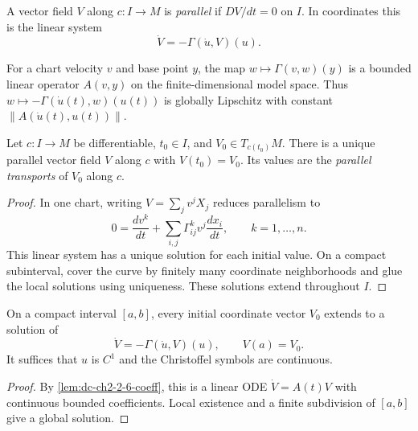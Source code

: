 \begin{definition}
  \label{def:dc-ch2-2-5}


  A vector field $V$ along $c\colon I\to M$ is \emph{parallel} if
  $DV/dt=0$ on $I$. In coordinates this is the linear system
  \[
    \dot V=-\Gamma(\dot u,V)(u).
  \]
\end{definition}

\begin{lemma}
  \label{lem:dc-ch2-2-6-coeff}


  For a chart velocity $v$ and base point $y$, the map
  $w\mapsto\Gamma(v,w)(y)$ is a bounded linear operator $A(v,y)$ on the
  finite-dimensional model space. Thus
  $w\mapsto-\Gamma(\dot u(t),w)(u(t))$ is globally Lipschitz with constant
  $\lVert A(\dot u(t),u(t))\rVert$.
\end{lemma}

\begin{proposition}
  \label{prop:dc-ch2-2-6}


  Let $c\colon I\to M$ be differentiable, $t_0\in I$, and
  $V_0\in T_{c(t_0)}M$. There is a unique parallel vector field $V$ along $c$
  with $V(t_0)=V_0$. Its values are the \emph{parallel transports} of $V_0$
  along $c$.
\end{proposition}
\begin{proof}
  \sketch
  In one chart, writing $V=\sum_jv^jX_j$ reduces parallelism to
  \[
    0=\frac{dv^k}{dt}
      +\sum_{i,j}\Gamma_{ij}^kv^j\frac{dx_i}{dt},
      \qquad k=1,\dots,n.\tag{2}
  \]
  This linear system has a unique solution for each initial value. On a compact
  subinterval, cover the curve by finitely many coordinate neighborhoods and
  glue the local solutions using uniqueness. These solutions extend throughout
  $I$.
\end{proof}

\begin{lemma}
  \label{lem:dc-ch2-2-6-exist}


  On a compact interval $[a,b]$, every initial coordinate vector $V_0$ extends
  to a solution of
  \[
    \dot V=-\Gamma(\dot u,V)(u),\qquad V(a)=V_0.
  \]
  It suffices that $u$ is $C^1$ and the Christoffel symbols are continuous.
\end{lemma}
\begin{proof}
  \sketch
  By \cref{lem:dc-ch2-2-6-coeff}, this is a linear ODE
  $\dot V=A(t)V$ with continuous bounded coefficients. Local existence and a
  finite subdivision of $[a,b]$ give a global solution.
\end{proof}

